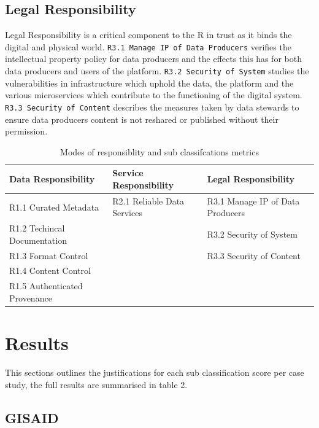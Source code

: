 \documentclass{article}
\begin{document}
\hypertarget{legal-responsibility}{%
\subsection{Legal Responsibility}\label{legal-responsibility}}

Legal Responsibility is a critical component to the R in trust as it
binds the digital and physical world.
\texttt{R3.1\ Manage\ IP\ of\ Data\ Producers} verifies the intellectual
property policy for data producers and the effects this has for both
data producers and users of the platform.
\texttt{R3.2\ Security\ of\ System} studies the vulnerabilities in
infrastructure which uphold the data, the platform and the various
microservices which contribute to the functioning of the digital system.
\texttt{R3.3\ Security\ of\ Content} describes the measures taken by
data stewards to ensure data producers content is not reshared or
published without their permission.

\begin{table}[H]

\caption{\label{tab:fig1}Modes of responsiblity and sub classifcations metrics}
\centering
\begin{tabular}[t]{l|l|l}
\hline
Data Responsibility & Service Responsibility & Legal Responsibility\\
\hline
R1.1 Curated Metadata & R2.1 Reliable Data Services & R3.1 Manage IP of Data Producers\\
\hline
R1.2 Techincal Documentation &  & R3.2 Security of System\\
\hline
R1.3 Format Control &  & R3.3 Security of Content\\
\hline
R1.4 Content Control &  & \\
\hline
R1.5  Authenticated Provenance &  & \\
\hline
\end{tabular}
\end{table}

\newpage

\hypertarget{results}{%
\section{Results}\label{results}}

This sections outlines the justifications for each sub classification
score per case study, the full results are summarised in table 2.

\hypertarget{gisaid}{%
\subsection{GISAID}\label{gisaid}}
\end{document}

